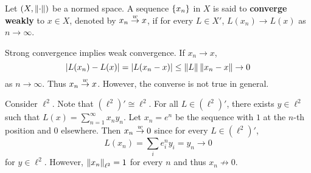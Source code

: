\begin{definition}
    Let $(X,\left\lVert {\cdot} \right\rVert)$ be a normed space. A sequence $\left\{ {x_n} \right\}$ 
    in $X$ is said to \textbf{converge weakly} to $x\in X$, denoted 
    by $x_n\overset{w}{\to} x$, if for every $L\in X'$, $L(x_n)\to 
    L(x)$ as $n\to\infty$.
\end{definition}
\begin{remark}
    Strong convergence implies weak convergence. If $x_n\to x$, 
    \begin{equation*}
        \left\lvert {L(x_n)-L(x)} \right\rvert = \left\lvert {L(x_n-x)} \right\rvert\leq\left\lVert {L} \right\rVert\left\lVert {x_n-x} \right\rVert\to 0
    \end{equation*}
    as $n\to\infty$. Thus $x_n\overset{w}{\to} x$. However, the 
    converse is not true in general.
\end{remark}

\begin{example}
    Consider $\ell^2$. Note that $(\ell^2)'\cong\ell^2$. For all 
    $L\in(\ell^2)'$, there exists $y\in\ell^2$ such that $L(x) = 
    \sum_{n=1}^\infty x_ny_n$. Let $x_n = e^n$ be the sequence 
    with $1$ at the $n$-th position and $0$ elsewhere. Then 
    $x_n\overset{w}{\to} 0$ since for every $L\in(\ell^2)'$, 
    \begin{equation*}
        L(x_n) = \sum_{i} e^n_iy_i = y_n\to 0
    \end{equation*} 
    for $y\in\ell^2$. However, $\left\lVert {x_n} \right\rVert_{\ell^2} = 1$ for 
    every $n$ and thus $x_n\not\to 0$. 
\end{example}

